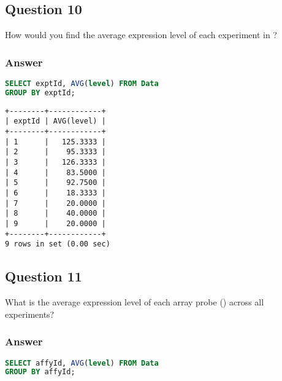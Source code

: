 \subsection*{Question 10}
How would you find the average expression level of each experiment in ?

\subsubsection*{Answer}

\begin{lstlisting}[language=sql]
SELECT exptId, AVG(level) FROM Data
GROUP BY exptId;
\end{lstlisting}

\begin{lstlisting}[style=output]
+--------+------------+
| exptId | AVG(level) |
+--------+------------+
| 1      |   125.3333 |
| 2      |    95.3333 |
| 3      |   126.3333 |
| 4      |    83.5000 |
| 5      |    92.7500 |
| 6      |    18.3333 |
| 7      |    20.0000 |
| 8      |    40.0000 |
| 9      |    20.0000 |
+--------+------------+
9 rows in set (0.00 sec)
\end{lstlisting}

\subsection*{Question 11}
What is the average expression level of each array probe () across all experiments?

\subsubsection*{Answer}

\begin{lstlisting}[language=sql]
SELECT affyId, AVG(level) FROM Data
GROUP BY affyId;
\end{lstlisting}

